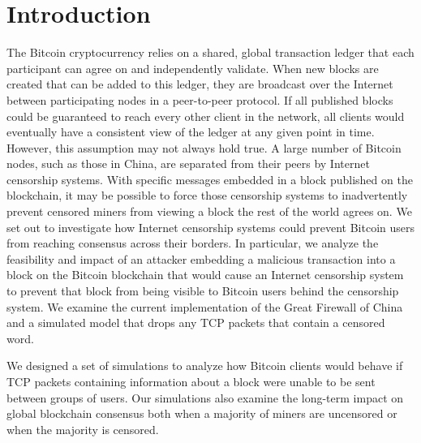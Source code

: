\section{Introduction}
The Bitcoin cryptocurrency relies on a shared, global transaction ledger that each participant can agree on and independently validate. 
When new blocks are created that can be added to this ledger, they are broadcast over the Internet between participating nodes in a peer-to-peer protocol. 
If all published blocks could be guaranteed to reach every other client in the network, all clients would eventually have a consistent view of the ledger at any given point in time. 
However, this assumption may not always hold true. A large number of Bitcoin nodes, such as those in China, are separated from their peers by Internet censorship systems. 
With specific messages embedded in a block published on the blockchain, it may be possible to force those censorship systems to inadvertently prevent censored miners from viewing a block the rest of the world agrees on.
We set out to investigate how Internet censorship systems could prevent Bitcoin users from reaching consensus across their borders.
In particular, we analyze the feasibility and impact of an attacker embedding a malicious transaction into a block on the Bitcoin blockchain that would cause an Internet censorship system to prevent that block from being visible to Bitcoin users behind the censorship system.
We examine the current implementation of the Great Firewall of China and a simulated model that drops any TCP packets that contain a censored word.

We designed a set of simulations to analyze how Bitcoin clients would behave if TCP packets containing information about a block were unable to be sent between groups of users.
Our simulations also examine the long-term impact on global blockchain consensus both when a majority of miners are uncensored or when the majority is censored.



